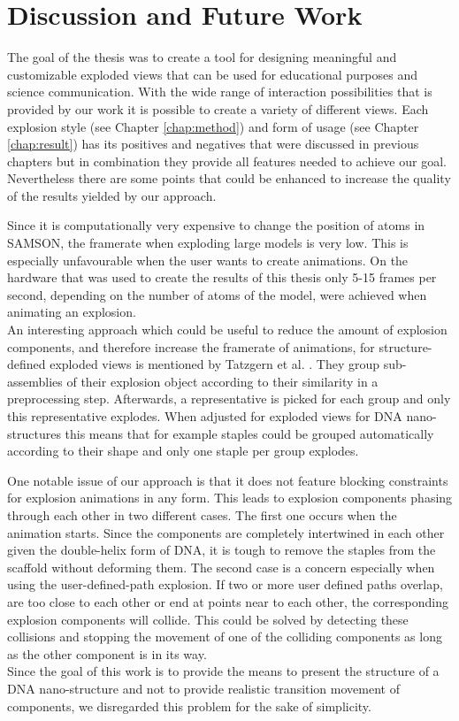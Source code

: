 \documentclass[draft,final]{vutinfth} %
\begin{document}
\chapter{Discussion and Future Work}
\label{chap:openI}

The goal of the thesis was to create a tool for designing meaningful and customizable exploded views that can be used for educational purposes and science communication. With the wide range of interaction possibilities that is provided by our work it is possible to create a variety of different views. Each explosion style (see Chapter \ref{chap:method}) and form of usage (see Chapter \ref{chap:result}) has its positives and negatives that were discussed in previous chapters but in combination they provide all features needed to achieve our goal. Nevertheless there are some points that could be enhanced to increase the quality of the results yielded by our approach.

\par Since it is computationally very expensive to change the position of atoms in SAMSON, the framerate when exploding large models is very low. This is especially unfavourable when the user wants to create animations. On the hardware that was used to create the results of this thesis only 5-15 frames per second, depending on the number of atoms of the model, were achieved when animating an explosion.
\\An interesting approach which could be useful to reduce the amount of explosion components, and therefore increase the framerate of animations, for structure-defined exploded views is mentioned by Tatzgern et al. \cite{tatzgern2010compact}. They group sub-assemblies of their explosion object according to their similarity in a preprocessing step. Afterwards, a representative is picked for each group and only this representative explodes. When adjusted for exploded views for DNA nano-structures this means that for example staples could be grouped automatically according to their shape and only one staple per group explodes.

\par One notable issue of our approach is that it does not feature blocking constraints for explosion animations in any form. This leads to explosion components phasing through each other in two different cases. The first one occurs when the animation starts. Since the components are completely intertwined in each other given the double-helix form of DNA, it is tough to remove the staples from the scaffold without deforming them. The second case is a concern especially when using the user-defined-path explosion. If two or more user defined paths overlap, are too close to each other or end at points near to each other, the corresponding explosion components will collide. This could be solved by detecting these collisions and stopping the movement of one of the colliding components as long as the other component is in its way.
\\ Since the goal of this work is to provide the means to present the structure of a DNA nano-structure and not to provide realistic transition movement of components, we disregarded this problem for the sake of simplicity.
\end{document}
